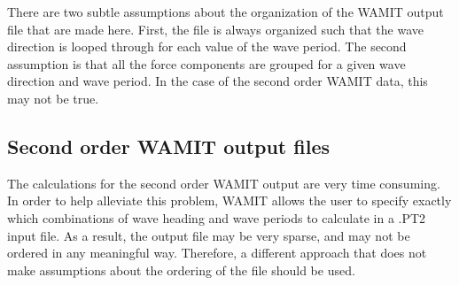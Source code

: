 There are two subtle assumptions about the organization of the WAMIT output file that are made here.  First, the file is always organized such that the wave direction is looped through for each value of the wave period.  The second assumption is that all the force components are grouped for a given wave direction and wave period.  In the case of the second order WAMIT data, this may not be true.

\subsection{Second order WAMIT output files}

The calculations for the second order WAMIT output are very time consuming.  In order to help alleviate this problem, WAMIT allows the user to specify exactly which combinations of wave heading and wave periods to calculate in a .PT2 input file.  As a result, the output file may be very sparse, and may not be ordered in any meaningful way.  Therefore, a different approach that does not make assumptions about the ordering of the file should be used.

